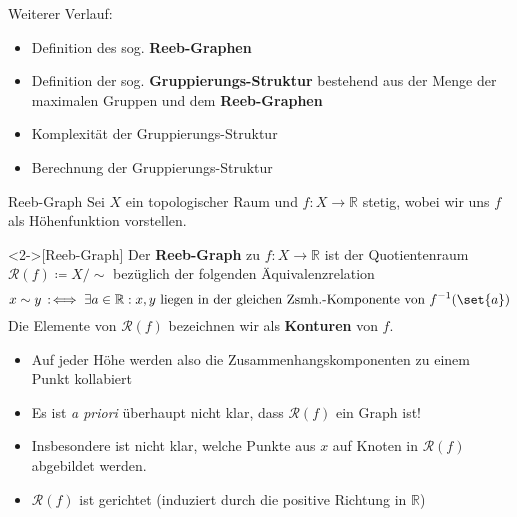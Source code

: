\documentclass[
wide,
10pt,
xcolor={x11names,svgnames},
hyperref={pdfauthor={Jannes Bantje},colorlinks,urlcolor=maincolor,hidelinks=false,linkcolor=maincolor},
pantone312, 	%
]{beamer}
\DeclareRobustCommand{\GrpStruktur}{Gruppierungs-Struktur\xspace}
\newcommand{\Index}[1]{\bet{#1}}
\newcommand{\bet}[1]{\textbf{\color{maincolor}#1}}
\theoremstyle{definition}
\begin{document}
\begin{frame}
    Weiterer Verlauf:
    \begin{itemize}[<+->]
        \item Definition des sog. \bet{Reeb-Graphen}
        \item Definition der sog. \bet{\GrpStruktur} bestehend aus der Menge der maximalen Gruppen und dem \bet{Reeb-Graphen}
        \item Komplexität der \GrpStruktur
        \item Berechnung der \GrpStruktur
    \end{itemize}
\end{frame}

\begin{frame}{Reeb-Graph}
    Sei $X$ ein topologischer Raum und $f \colon X \to \mathbb{R}$ stetig, wobei wir uns $f$ als Höhenfunktion vorstellen.
    \begin{definition}<2->[Reeb-Graph]
    	Der \bet{Reeb-Graph} zu $f \colon X \to \mathbb{R}$ ist der Quotientenraum $\mathcal{R}(f) \coloneqq X/{\sim}$ bezüglich der folgenden Äquivalenzrelation
    	\[
    		x \sim y \,:\mkern-3mu\iff \exists a \in \mathbb{R} : x,y \text{ liegen in der gleichen Zsmh.-Komponente von } f^{-1}(\set{a})
    	\]
    	Die Elemente von $\mathcal{R}(f)$ bezeichnen wir als \Index{Konturen} von $f$.
    \end{definition}
    \begin{itemize}
        \item<3-> Auf jeder Höhe werden also die Zusammenhangskomponenten zu einem Punkt kollabiert
        \item<4-> Es ist \emph{a priori} überhaupt nicht klar, dass $\mathcal{R}(f)$ ein Graph ist!
        \item<5-> Insbesondere ist nicht klar, welche Punkte aus $x$ auf Knoten in $\mathcal{R}(f)$ abgebildet werden.
        \item<6-> $\mathcal{R}(f)$ ist gerichtet (induziert durch die positive Richtung in $\mathbb{R}$)
    \end{itemize}
\end{frame}
\end{document}
